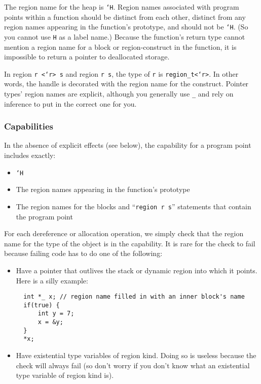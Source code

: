 The region name for the heap is \texttt{`H}.  Region names associated
with program points within a function should be distinct from each
other, distinct from any region names appearing in the function's
prototype, and should not be \texttt{`H}.  (So you cannot use
\texttt{H} as a label name.)  Because the function's return type
cannot mention a region name for a block or region-construct in the
function, it is impossible to return a pointer to deallocated storage.

In region \texttt{r <`r> s} and region \texttt{r s}, the type of \texttt{r}
is \texttt{region_t<`r>}.  In other words, the handle is decorated with
the region name for the construct.  Pointer types' region names are
explicit, although you generally use \texttt{_} and rely on inference to
put in the correct one for you.

\subsubsection{Capabilities}

In the absence of explicit effects (see below), the capability for a
program point includes exactly:
\begin{itemize}
\item \texttt{`H}
\item The region names appearing in the function's prototype 
\item The region names for the blocks and ``\texttt{region r s}''
  statements that contain the program point
\end{itemize}

For each dereference or allocation operation, we simply check that the
region name for the type of the object is in the capability.  It is
rare for the check to fail because failing code has to do one of the
following:
\begin{itemize}
\item Have a pointer that outlives the stack or dynamic region into
  which it points.  Here is a silly example:
\begin{verbatim}
  int *_ x; // region name filled in with an inner block's name
  if(true) {
      int y = 7;
      x = &y;
  }
  *x; 
\end{verbatim}

\item Have existential type variables of region kind.  Doing so is
  useless because the check will always fail (so don't worry if you
  don't know what an existential type variable of region kind is).
\end{itemize}


